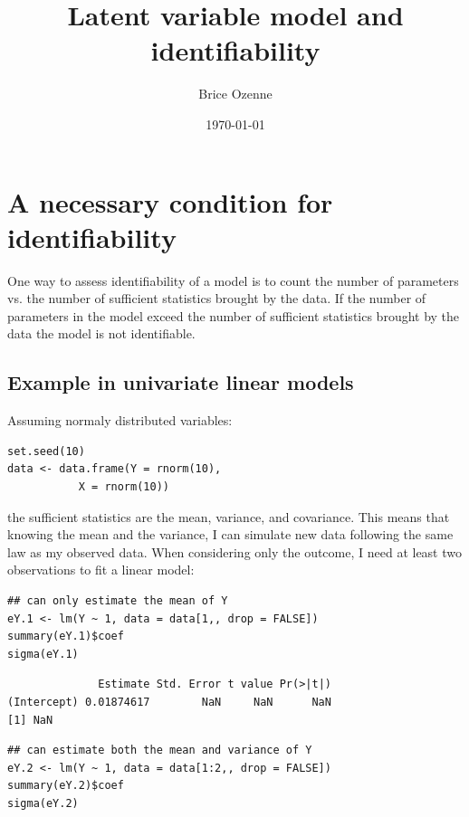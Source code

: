 \documentclass[12pt]{article}
\author{Brice Ozenne}
\date{\today}
\title{Latent variable model and identifiability}
\begin{document}
\maketitle
\lstset{style=code-tiny}

\section{A necessary condition for identifiability}
\label{sec:orgc137cef}
One way to assess identifiability of a model is to count the number of
parameters vs. the number of sufficient statistics brought by the
data. If the number of parameters in the model exceed the number of
sufficient statistics brought by the data the model is not
identifiable.

\subsection{Example in univariate linear models}
\label{sec:org19d7c4f}
Assuming normaly distributed variables:

\bigskip

\lstset{language=r,label= ,caption= ,captionpos=b,numbers=none}
\begin{lstlisting}
set.seed(10)
data <- data.frame(Y = rnorm(10),
		   X = rnorm(10))
\end{lstlisting}

\bigskip

the sufficient statistics are the mean, variance, and covariance. This
means that knowing the mean and the variance, I can simulate new data
following the same law as my observed data. When considering only the
outcome, I need at least two observations to fit a linear model:

\bigskip

\lstset{language=r,label= ,caption= ,captionpos=b,numbers=none}
\begin{lstlisting}
## can only estimate the mean of Y
eY.1 <- lm(Y ~ 1, data = data[1,, drop = FALSE])
summary(eY.1)$coef
sigma(eY.1)
\end{lstlisting}

\begin{verbatim}
              Estimate Std. Error t value Pr(>|t|)
(Intercept) 0.01874617        NaN     NaN      NaN
[1] NaN
\end{verbatim}

\clearpage

\lstset{language=r,label= ,caption= ,captionpos=b,numbers=none}
\begin{lstlisting}
## can estimate both the mean and variance of Y
eY.2 <- lm(Y ~ 1, data = data[1:2,, drop = FALSE])
summary(eY.2)$coef
sigma(eY.2)
\end{lstlisting}
\end{document}
